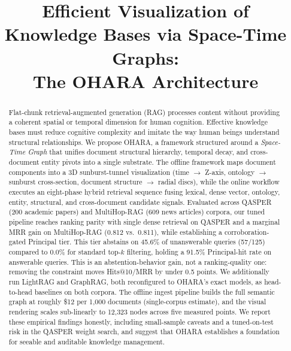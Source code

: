 \documentclass[conference,a4paper]{IEEEtran}
\begin{document}
\title{Efficient Visualization of Knowledge Bases via Space-Time Graphs:\\ The OHARA Architecture}

\author{
}

\maketitle

\begin{abstract}
Flat-chunk retrieval-augmented generation (RAG) processes content without providing a coherent spatial or temporal dimension for human cognition. Effective knowledge bases must reduce cognitive complexity and imitate the way human beings understand structural relationships. We propose OHARA, a framework structured around a \emph{Space-Time Graph} that unifies document structural hierarchy, temporal decay, and cross-document entity pivots into a single substrate. The offline framework maps document components into a 3D sunburst-tunnel visualization (time $\to$ Z-axis, ontology $\to$ sunburst cross-section, document structure $\to$ radial discs), while the online workflow executes an eight-phase hybrid retrieval sequence fusing lexical, dense vector, ontology, entity, structural, and cross-document candidate signals. Evaluated across QASPER (200 academic papers) and MultiHop-RAG (609 news articles) corpora, our tuned pipeline reaches ranking parity with single dense retrieval on QASPER and a marginal MRR gain on MultiHop-RAG (0.812 vs.\ 0.811), while establishing a corroboration-gated Principal tier. This tier abstains on 45.6\% of unanswerable queries (57/125) compared to 0.0\% for standard top-$k$ filtering, holding a 91.5\% Principal-hit rate on answerable queries. This is an abstention-behavior gain, not a ranking-quality one: removing the constraint moves Hits@10/MRR by under 0.5 points. We additionally run LightRAG and GraphRAG, both reconfigured to OHARA's exact models, as head-to-head baselines on both corpora. The offline ingest pipeline builds the full semantic graph at roughly \$12 per 1{,}000 documents (single-corpus estimate), and the visual rendering scales sub-linearly to 12{,}323 nodes across five measured points. We report these empirical findings honestly, including small-sample caveats and a tuned-on-test risk in the QASPER weight search, and suggest that OHARA establishes a foundation for seeable and auditable knowledge management.
\end{abstract}
\end{document}
